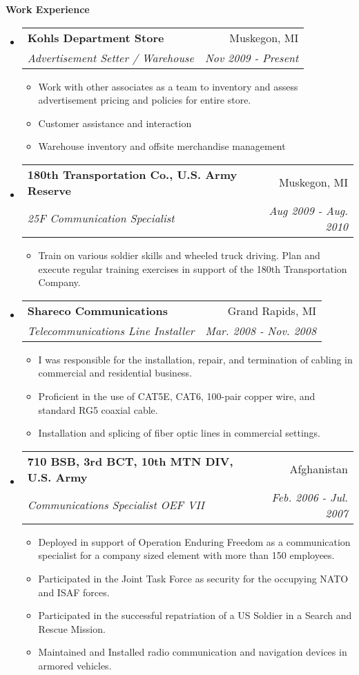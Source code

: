 \documentclass[letterpaper,11pt]{article}
\makeatletter
\newcommand{\resitem}[1]{\item #1 \vspace{-2pt}}
\newcommand{\resheading}[1]{{\large \colorbox{mygrey}{\begin{minipage}{\textwidth}{\textbf{#1 \vphantom{p\^{E}}}}\end{minipage}}}}
\newcommand{\ressubheading}[4]{
\begin{tabular*}{7.0in}{l@{\extracolsep{\fill}}r}
		\textbf{#1} & #2 \\
		\textit{#3} & \textit{#4} \\
\end{tabular*}\vspace{-6pt}}
\makeatother
\begin{document}
\resheading{Work Experience}
\begin{itemize}
\item 
	\ressubheading{Kohls Department Store}{Muskegon, MI}{Advertisement Setter / Warehouse}{Nov 2009 - Present}
	\begin{itemize}
		\resitem{Work with other associates as a team to inventory and assess advertisement pricing and policies for entire store.}
		\resitem{Customer assistance and interaction}
		\resitem{Warehouse inventory and offsite merchandise management}
	\end{itemize}
\item

\vspace{0.1in}

	\ressubheading{180th Transportation Co., U.S. Army Reserve}{Muskegon, MI}{25F Communication Specialist}{Aug 2009 - Aug. 2010}
	\begin{itemize}
		\resitem{Train on various soldier skills and wheeled truck driving. Plan and execute regular training exercises in support of the 180th Transportation Company.}
	\end{itemize}
\item

\vspace{0.1in}

	\ressubheading{Shareco Communications}{Grand Rapids, MI}{Telecommunications Line Installer}{Mar. 2008 - Nov. 2008}
	\begin{itemize}
		\resitem{I was responsible for the installation, repair, and termination of cabling in commercial and residential business.}
		\resitem{Proficient in the use of  CAT5E, CAT6, 100-pair copper wire, and standard RG5 coaxial cable.}
		\resitem{Installation and splicing of fiber optic lines in commercial settings.}
	\end{itemize}

\item

\pagebreak
	\ressubheading{710 BSB, 3rd BCT, 10th MTN DIV, U.S. Army}{Afghanistan}{Communications Specialist OEF VII}{Feb. 2006 - Jul. 2007}
	\begin{itemize}
		\resitem{Deployed in support of Operation Enduring Freedom as a communication specialist for a company sized element with more than 150 employees. }
		\resitem{Participated in the Joint Task Force as security for the occupying NATO and ISAF forces.}
		\resitem{Participated in the successful repatriation of a US Soldier in a Search and Rescue Mission.}
		\resitem{Maintained and Installed radio communication and navigation devices in armored vehicles.}
	\end{itemize}


\end{itemize}
\end{document}
